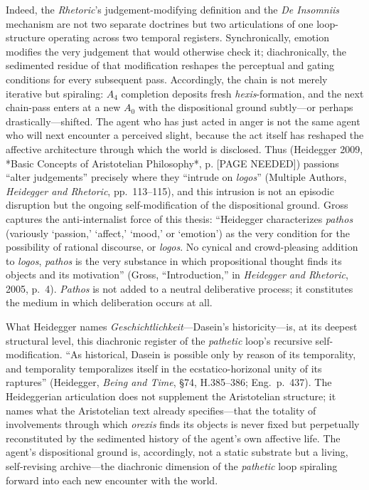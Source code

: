 \documentclass{article}
\begin{document}
Indeed, the \textit{Rhetoric}'s judgement-modifying definition and the \textit{De Insomniis} mechanism are not two separate doctrines but two articulations of one loop-structure operating across two temporal registers. Synchronically, emotion modifies the very judgement that would otherwise check it; diachronically, the sedimented residue of that modification reshapes the perceptual and gating conditions for every subsequent pass. Accordingly, the chain is not merely iterative but spiraling: $A_4$ completion deposits fresh \textit{hexis}-formation, and the next chain-pass enters at a new $A_0$ with the dispositional ground subtly---or perhaps drastically---shifted. The agent who has just acted in anger is not the same agent who will next encounter a perceived slight, because the act itself has reshaped the affective architecture through which the world is disclosed. Thus (Heidegger 2009, *Basic Concepts of Aristotelian Philosophy*, p. [PAGE NEEDED]) passions ``alter judgements'' precisely where they ``intrude on \textit{logos}'' (Multiple Authors, \textit{Heidegger and Rhetoric}, pp.~113--115), and this intrusion is not an episodic disruption but the ongoing self-modification of the dispositional ground. Gross captures the anti-internalist force of this thesis: ``Heidegger characterizes \textit{pathos} (variously `passion,' `affect,' `mood,' or `emotion') as the very condition for the possibility of rational discourse, or \textit{logos}. No cynical and crowd-pleasing addition to \textit{logos}, \textit{pathos} is the very substance in which propositional thought finds its objects and its motivation'' (Gross, ``Introduction,'' in \textit{Heidegger and Rhetoric}, 2005, p.~4). \textit{Pathos} is not added to a neutral deliberative process; it constitutes the medium in which deliberation occurs at all.

What Heidegger names \textit{Geschichtlichkeit}---Dasein's historicity---is, at its deepest structural level, this diachronic register of the \textit{pathetic} loop's recursive self-modification. ``As historical, Dasein is possible only by reason of its temporality, and temporality temporalizes itself in the ecstatico-horizonal unity of its raptures'' (Heidegger, \textit{Being and Time}, \S 74, H.385--386; Eng.~p.~437). The Heideggerian articulation does not supplement the Aristotelian structure; it names what the Aristotelian text already specifies---that the totality of involvements through which \textit{orexis} finds its objects is never fixed but perpetually reconstituted by the sedimented history of the agent's own affective life. The agent's dispositional ground is, accordingly, not a static substrate but a living, self-revising archive---the diachronic dimension of the \textit{pathetic} loop spiraling forward into each new encounter with the world.
\end{document}
